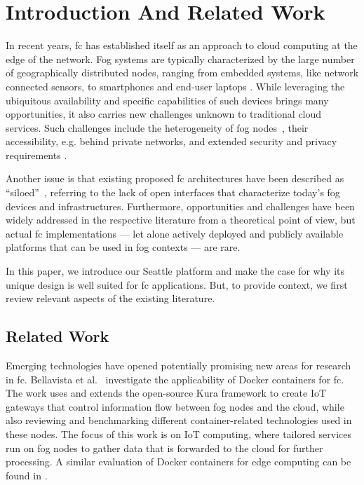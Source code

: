 \section{Introduction And Related Work}

In recent years, \gls{fc} has established itself as an approach to
cloud computing at the edge of the network. Fog systems are typically
characterized by the large number of geographically distributed
nodes, ranging
from embedded systems, like network connected
sensors, to smartphones and end-user laptops
\cite{Bonomi:2012:FCR:2342509.2342513,Yi:2015:SFC:2757384.2757397,dastjerdi_fog_2016}.
While leveraging the
ubiquitous availability and specific capabilities of such devices brings
many opportunities, it also carries new challenges unknown to traditional cloud
services. Such challenges include the heterogeneity of fog
nodes~\cite{Bonomi:2012:FCR:2342509.2342513,7868354,Yi:2015:SFC:2757384.2757397,mahmud_fog_2016},
their accessibility, e.g. behind private networks, and extended security and
privacy requirements \cite{botta_integration_2016}.

Another issue is that existing proposed \gls{fc} architectures have
been described
as ``siloed''~\cite{belli_design_2015}, referring to the lack of
open interfaces that characterize today's fog devices and infrastructures.
Furthermore, opportunities and challenges have been widely addressed in the
respective literature from a theoretical point of view, but actual \gls{fc}
implementations --- let alone actively deployed and
publicly available platforms that can be used in fog contexts --- are rare.

In this paper, we introduce our Seattle platform and make the case for
why its unique design is well suited for \gls{fc} applications. But,
to provide context, we first review relevant aspects of the existing
literature.

\subsection{Related Work}

Emerging technologies have opened potentially promising new areas
for research in \gls{fc}.
Bellavista et al.~\cite{bellavista_feasibility_2017} investigate the
applicability of Docker containers for \gls{fc}. The work uses and extends
the open-source Kura framework to create \gls{IoT} gateways that control information
flow between fog nodes and the cloud, while also reviewing and benchmarking
different container-related technologies used in these nodes.
The focus of this work is on \gls{IoT} computing, where tailored services run
on fog nodes to gather data that is forwarded to the cloud for further processing.
A similar evaluation of Docker containers for edge computing can be found in
\cite{ismail_evaluation_2015}.

